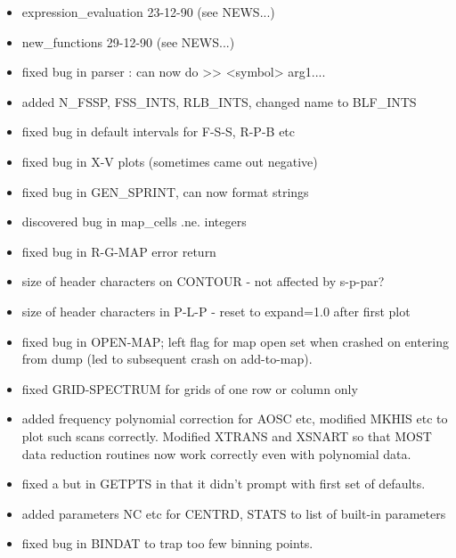 \documentclass[twoside,11pt,nolof]{starlink}
\begin{document}
\begin{itemize}

\item  expression\_evaluation 23-12-90  (see NEWS...)

\item   new\_functions 29-12-90 (see NEWS...)

\item   fixed bug in parser : can now do >> <symbol> arg1....

\item   added N\_FSSP, FSS\_INTS, RLB\_INTS, changed name to BLF\_INTS

\item   fixed bug in default intervals for F-S-S, R-P-B etc
\item   fixed bug in X-V plots (sometimes came out negative)

\item   fixed bug in GEN\_SPRINT, can now format strings

\item   discovered bug in map\_cells .ne. integers

\item   fixed bug in R-G-MAP error return

\item  size of header characters on CONTOUR - not affected by s-p-par?
\item  size of header characters in P-L-P   - reset to expand=1.0 after first plot

\item   fixed bug in OPEN-MAP; left flag for map open set when crashed on entering
  from dump (led to subsequent crash on add-to-map).

\item   fixed GRID-SPECTRUM for grids of one row or column only

\item   added frequency polynomial correction for AOSC etc, modified MKHIS etc
  to plot such scans correctly. Modified XTRANS and XSNART so that MOST
  data reduction routines now work correctly even with polynomial data.

\item   fixed a but in GETPTS in that it didn't prompt with first set of defaults.

\item   added parameters NC etc for CENTRD, STATS to list of built-in parameters

\item   fixed bug in BINDAT to trap too few binning points.

\end{itemize}
\end{document}
